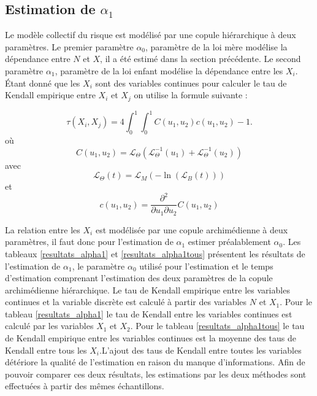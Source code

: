 \documentclass{article}
\begin{document}
	\subsection{Estimation de $\alpha_{1}$}
	
	Le modèle collectif du risque est modélisé par une copule hiérarchique à deux paramètres. Le premier paramètre $\alpha_{0}$, paramètre de la loi mère modélise la dépendance entre $N$ et $X$, il a été estimé dans la section précédente. Le second paramètre $\alpha_{1}$, paramètre de la loi enfant modélise la dépendance entre les $X_{i}$. Étant donné que les $X_{i}$ sont des variables continues pour calculer le tau de Kendall empirique entre $X_{i}$ et $X_{j}$ on utilise la formule suivante :
	
	\begin{equation}\label{eq_tau_continu}
	\tau (X_{i},X_{j}) = 4 \int_{0}^{1}\int_{0}^{1} C(u_{1},u_{2})c(u_{1},u_{2}) - 1.
	\end{equation}
	où  \[ C(u_{1},u_{2}) = \mathscr{L}_{\Theta}(\mathscr{L}_{\Theta}^{-1}(u_{1}) + \mathscr{L}_{\Theta}^{-1}(u_{2}) )  \]
	avec    \[ \mathscr{L}_{\Theta}(t) = \mathscr{L}_{M}(-\ln(\mathscr{L}_{B}(t))) \]
	et	\[ c(u_{1},u_{2}) =  \frac{\partial^2}{\partial u_{1}\partial u_{2}}C(u_{1},u_{2})  \]
	
	La relation entre les $X_{i}$ est modélisée par une copule archimédienne à deux paramètres, il faut donc pour l'estimation de $\alpha_{1}$ estimer préalablement $\alpha_{0}$. 
	Les tableaux \ref{resultats_alpha1} et \ref{resultats_alpha1tous} présentent les résultats de l'estimation de $\alpha_{1}$, le paramètre $\alpha_{0}$ utilisé pour l'estimation et le temps d'estimation comprenant l'estimation des deux paramètres de la copule archimédienne hiérarchique. Le tau de Kendall empirique entre les variables continues et la variable discrète est calculé à partir des variables $N$ et $X_{1}$. Pour le tableau \ref{resultats_alpha1} le tau de Kendall entre les variables continues est calculé par les variables $X_{1}$ et $X_{2}$. Pour le tableau \ref{resultats_alpha1tous} le tau de Kendall empirique entre les variables continues est la moyenne des taus de Kendall entre tous les $X_{i}$.L'ajout des taus de Kendall entre toutes les variables détériore la qualité de l'estimation en raison du manque d’informations. Afin de pouvoir comparer ces deux résultats, les estimations par les deux méthodes sont effectuées à partir des mêmes échantillons.
	
\end{document}
